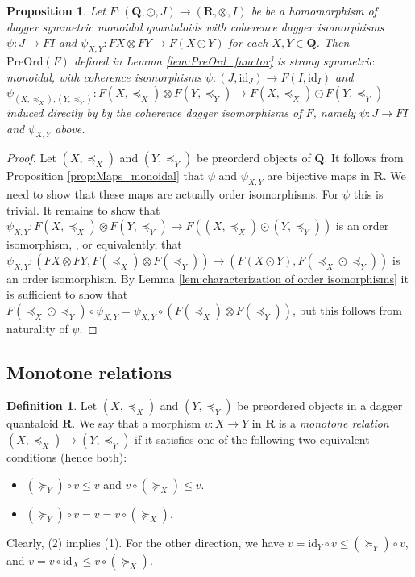 \documentclass[12pt]{tac}
\newtheorem{proposition}[theorem]{Proposition}
\theoremstyle{definition}
\newtheorem{definition}[theorem]{Definition}
\theoremstyle{remark}
\newcommand{\qo}{{\boldsymbol{\preccurlyeq}}}
\newcommand{\qop}{{\boldsymbol{\succcurlyeq}}}
\newcommand{\<}{\langle}
\renewcommand{\>}{\rangle}
\renewcommand{\:}{\colon}
\newcommand{\id}{\mathrm{id}}
\begin{document}
\begin{proposition}\label{prop:PreOrd_monoidal}
    Let $F:(\mathbf Q,\odot,J)\to (\mathbf R,\otimes,I)$ be be a homomorphism of dagger symmetric monoidal quantaloids with coherence dagger isomorphisms $\psi:J\to FI$ and $\psi_{X,Y}:FX\otimes FY\to F(X\odot Y)$ for each $X,Y\in\mathbf Q$. Then $\mathrm{PreOrd}(F)$ defined in Lemma \ref{lem:PreOrd_functor} is strong symmetric monoidal, with coherence isomorphisms $\psi:(J,\id_J)\to F(I,\id_{I})$ and $\psi_{(X,\qo_X),(Y,\qo_Y)}:F(X,\qo_X)\otimes F(Y,\qo_Y)\to F(X,\qo_X)\odot F(Y,\qo_Y)$ induced directly by by the coherence dagger isomorphisms of $F$, namely $\psi:J\to FI$ and $\psi_{X,Y}$ above.
\end{proposition}
    
\begin{proof}
Let $(X,\qo_X)$ and $(Y,\qo_Y)$ be preorderd objects of $\mathbf Q$. It follows from Proposition \ref{prop:Maps_monoidal} that $\psi$ and $\psi_{X,Y}$ are bijective maps in $\mathbf R$. We need to show that these maps are actually order isomorphisms. For $\psi$ this is trivial. It remains to show that $\psi_{X,Y}:F(X,\qo_X)\otimes F(Y,\qo_Y)\to F((X,\qo_X)\odot(Y,\qo_Y))$ is an order isomorphism, , or equivalently, that $\psi_{X,Y}:(FX\otimes FY, F(\qo_X)\otimes F(\qo_Y))\to(F(X\odot Y),F(\qo_X\odot \qo_Y))$ is an order isomorphism. By Lemma  \ref{lem:characterization of order isomorphisms} it is sufficient to show that $F(\qo_X\odot \qo_Y)\circ\psi_{X,Y}=\psi_{X,Y}\circ (F(\qo_X)\otimes F(\qo_Y))$, but this follows from naturality of $\psi$. 
\end{proof}

\subsection{Monotone relations}

\begin{definition}
Let $(X,\qo_X)$ and $(Y,\qo_Y)$ be preordered objects in a dagger quantaloid $\mathbf R$. We say that a morphism  $v:X\to Y$ in $\mathbf R$ is a \emph{monotone relation} $(X,\qo_X)\to(Y,\qo_Y)$ if it satisfies one of the following two equivalent conditions (hence both):
\begin{itemize}
    \item[(1)] $(\qop_Y)\circ v\leq v$ and $v\circ (\qop_X)\leq v$.
    \item[(2)] $(\qop_Y)\circ v=v=v\circ (\qop_X)$. 
\end{itemize}
\end{definition}
Clearly, (2) implies (1). For the other direction, we have $v=\id_Y\circ v\leq (\qop_Y)\circ v$, and $v=v\circ \id_X\leq v\circ (\qop_X)$. 
\end{document}
